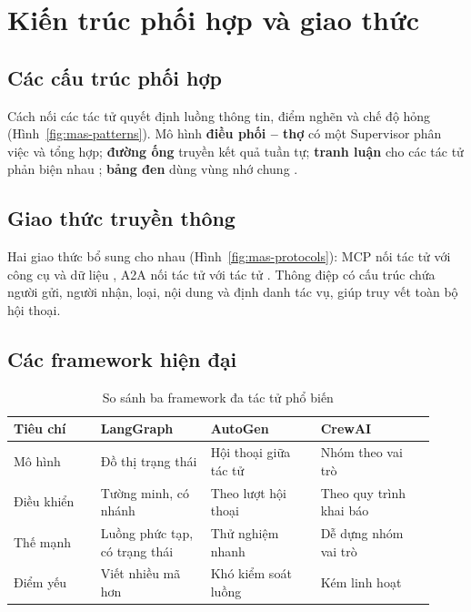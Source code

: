\section{Kiến trúc phối hợp và giao thức}\label{sec:mas-arch}
\subsection{Các cấu trúc phối hợp}
Cách nối các tác tử quyết định luồng thông tin, điểm nghẽn và chế độ hỏng (Hình~\ref{fig:mas-patterns}). Mô hình \textbf{điều phối -- thợ} có một Supervisor phân việc và tổng hợp; \textbf{đường ống} truyền kết quả tuần tự; \textbf{tranh luận} cho các tác tử phản biện nhau \cite{ch7:du2024debate}; \textbf{bảng đen} dùng vùng nhớ chung \cite{ch7:erman1980}.


\subsection{Giao thức truyền thông}
Hai giao thức bổ sung cho nhau (Hình~\ref{fig:mas-protocols}): MCP nối tác tử với công cụ và dữ liệu \cite{ch7:mcp2024}, A2A nối tác tử với tác tử \cite{ch7:a2a2025}. Thông điệp có cấu trúc chứa người gửi, người nhận, loại, nội dung và định danh tác vụ, giúp truy vết toàn bộ hội thoại.


\subsection{Các framework hiện đại}
\begin{table}[!htbp]\centering\caption{So sánh ba framework đa tác tử phổ biến}\label{tab:mas-fw}
{\small\begin{tabular}{@{}L{0.19\linewidth}L{0.24\linewidth}L{0.24\linewidth}L{0.25\linewidth}@{}}
\toprule
\textbf{Tiêu chí} & \textbf{LangGraph} & \textbf{AutoGen} \cite{ch7:wu2023autogen} & \textbf{CrewAI} \\
\midrule
Mô hình & Đồ thị trạng thái & Hội thoại giữa tác tử & Nhóm theo vai trò \\
Điều khiển & Tường minh, có nhánh & Theo lượt hội thoại & Theo quy trình khai báo \\
Thế mạnh & Luồng phức tạp, có trạng thái & Thử nghiệm nhanh & Dễ dựng nhóm vai trò \\
Điểm yếu & Viết nhiều mã hơn & Khó kiểm soát luồng & Kém linh hoạt \\
\bottomrule
\end{tabular}}
\end{table}

